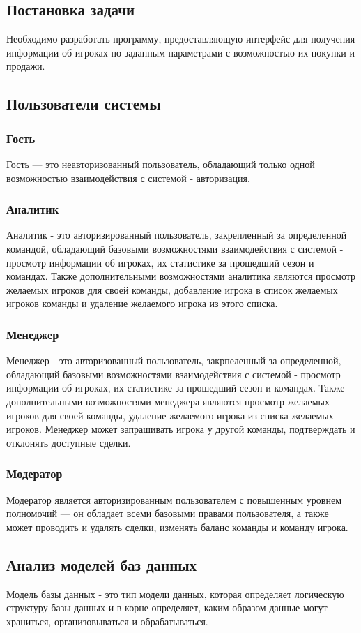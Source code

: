 \subsection{Постановка задачи}
Необходимо разработать программу, предоставляющую интерфейс для получения информации об игроках по заданным параметрами с возможностью их покупки и продажи.
\subsection{Пользователи системы}
\subsubsection{Гость}
Гость — это неавторизованный пользователь, обладающий только одной возможностью взаимодействия с системой - авторизация.
\subsubsection{Аналитик}
Аналитик - это авторизированный пользователь, закрепленный за определенной командой, обладающий базовыми возможностями взаимодействия с системой - просмотр информации об игроках, их статистике за прошедший сезон и командах. Также дополнительными возможностями аналитика являются просмотр желаемых игроков для своей команды, добавление игрока в список желаемых игроков команды и удаление желаемого игрока из этого списка.
\subsubsection{Менеджер} 
Менеджер - это авторизованный пользователь, закрпеленный за определенной, обладающий базовыми возможностями взаимодействия с системой - просмотр информации об игроках, их статистике за прошедший сезон и командах. Также дополнительными возможностями менеджера являются просмотр желаемых игроков для своей команды, удаление желаемого игрока из списка желаемых игроков. Менеджер может запрашивать игрока у другой команды, подтверждать и отклонять доступные сделки.
\subsubsection{Модератор}
Модератор является авторизированным пользователем с повышенным уровнем полномочий — он обладает всеми базовыми правами пользователя, а также может проводить и удалять сделки, изменять баланс команды и команду игрока.
\subsection{Анализ моделей баз данных}
Модель базы данных - это тип модели данных, которая определяет логическую структуру базы данных и в корне определяет, каким образом данные могут храниться, организовываться и обрабатываться.
